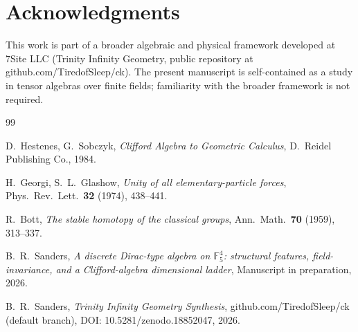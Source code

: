 \documentclass[11pt,reqno]{amsart}
\theoremstyle{plain}
\theoremstyle{definition}
\theoremstyle{remark}
\newcommand{\F}{\mathbb{F}}
\begin{document}
\section*{Acknowledgments}

This work is part of a broader algebraic and physical framework developed
at 7Site LLC (Trinity Infinity Geometry, public repository at
github.com/TiredofSleep/ck). The present manuscript is self-contained as
a study in tensor algebras over finite fields; familiarity with the
broader framework is not required.

\begin{thebibliography}{99}

 D.~Hestenes, G.~Sobczyk,
\emph{Clifford Algebra to Geometric Calculus},
D.~Reidel Publishing Co., 1984.

 H.~Georgi, S.~L.~Glashow,
\emph{Unity of all elementary-particle forces},
Phys.~Rev.~Lett.~\textbf{32} (1974), 438--441.

 R.~Bott,
\emph{The stable homotopy of the classical groups},
Ann.~Math.~\textbf{70} (1959), 313--337.

 B.~R.~Sanders,
\emph{A discrete Dirac-type algebra on $\F_5^4$: structural features,
field-invariance, and a Clifford-algebra dimensional ladder},
Manuscript in preparation, 2026.

 B.~R.~Sanders,
\emph{Trinity Infinity Geometry Synthesis},
github.com/TiredofSleep/ck (default branch),
DOI: 10.5281/zenodo.18852047, 2026.

\end{thebibliography}
\end{document}
